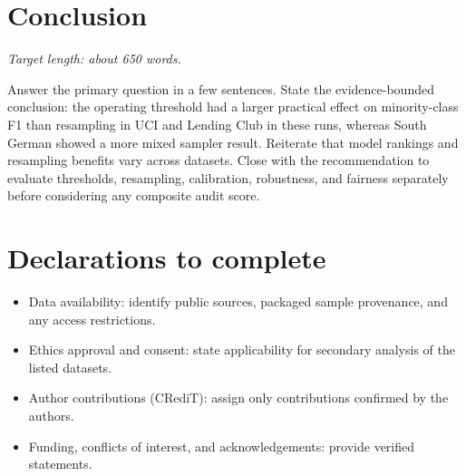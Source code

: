 \documentclass[pdflatex,sn-mathphys-num]{sn-jnl}
\begin{document}
\section{Conclusion}
\textit{Target length: about 650 words.}

Answer the primary question in a few sentences. State the evidence-bounded conclusion: the operating threshold had a larger practical effect on minority-class F1 than resampling in UCI and Lending Club in these runs, whereas South German showed a more mixed sampler result. Reiterate that model rankings and resampling benefits vary across datasets. Close with the recommendation to evaluate thresholds, resampling, calibration, robustness, and fairness separately before considering any composite audit score.

\section*{Declarations to complete}
\begin{itemize}
  \item Data availability: identify public sources, packaged sample provenance, and any access restrictions.
  \item Ethics approval and consent: state applicability for secondary analysis of the listed datasets.
  \item Author contributions (CRediT): assign only contributions confirmed by the authors.
  \item Funding, conflicts of interest, and acknowledgements: provide verified statements.
\end{itemize}

\end{document}
